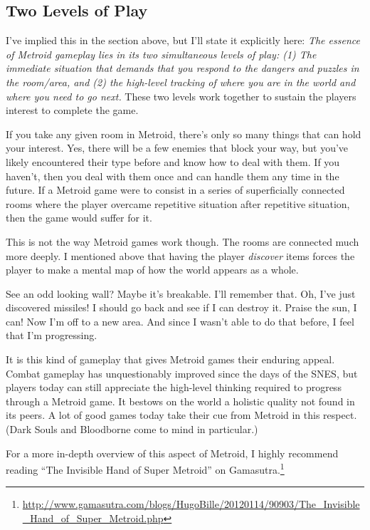 \documentclass{article}
\begin{document}
\subsection*{Two Levels of Play}
I've implied this in the section above, but I'll state it explicitly here: \emph{The essence of Metroid gameplay lies in its two simultaneous levels of play: (1) The immediate situation that demands that you respond to the dangers  and puzzles in the room/area, and (2) the high-level tracking of where you are in the world and where you need to go next.} These two levels work together to sustain the players interest to complete the game.

If you take any given room in Metroid, there's only so many things that can hold your interest. Yes, there will be a few enemies that block your way, but you've likely encountered their type before and know how to deal with them. If you haven't, then you deal with them once and can handle them any time in the future. If a Metroid game were to consist in a series of superficially connected rooms where the player overcame repetitive situation after repetitive situation, then the game would suffer for it.

This is not the way Metroid games work though. The rooms are connected much more deeply. I mentioned above that having the player \emph{discover} items forces the player to make a mental map of how the world appears as a whole.

See an odd looking wall? Maybe it's breakable. I'll remember that. Oh, I've just discovered missiles! I should go back and see if I can destroy it. Praise the sun, I can! Now I'm off to a new area. And since I wasn't able to do that before, I feel that I'm progressing.

It is this kind of gameplay that gives Metroid games their enduring appeal. Combat gameplay has unquestionably improved since the days of the SNES, but players today can still appreciate the high-level thinking required to progress through a Metroid game. It bestows on the world a holistic quality not found in its peers. A lot of good games today take their cue from Metroid in this respect. (Dark Souls and Bloodborne come to mind in particular.)

For a more in-depth overview of this aspect of Metroid, I highly recommend reading ``The Invisible Hand of Super Metroid'' on Gamasutra.\footnote{\url{http://www.gamasutra.com/blogs/HugoBille/20120114/90903/The_Invisible_Hand_of_Super_Metroid.php}}
\end{document}
